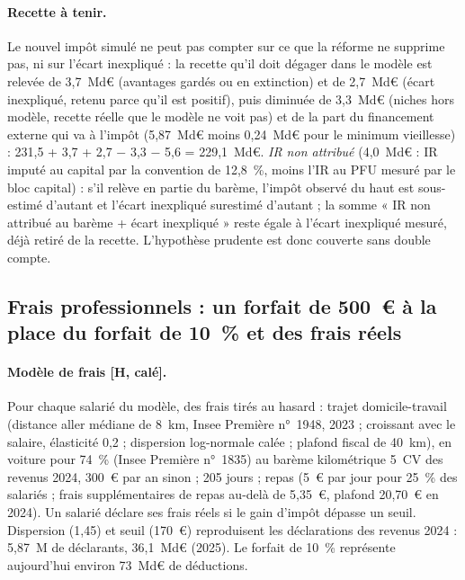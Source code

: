 \paragraph{Recette à tenir.} Le nouvel impôt simulé ne peut pas compter sur ce que la réforme ne supprime pas, ni sur l'écart inexpliqué : la recette qu'il doit dégager dans le modèle est relevée de 3,7~Md€ (avantages gardés ou en extinction) et de 2,7~Md€ (écart inexpliqué, retenu parce qu'il est positif), puis diminuée de 3,3~Md€ (niches hors modèle, recette réelle que le modèle ne voit pas) et de la part du financement externe qui va à l'impôt (5,87~Md€ moins 0,24~Md€ pour le minimum vieillesse) : 231,5 + 3,7 + 2,7 $-$ 3,3 $-$ 5,6 = 229,1~Md€. \emph{IR non attribué} (4,0~Md€ : IR imputé au capital par la convention de 12,8~\%, moins l'IR au PFU mesuré par le bloc capital) : s'il relève en partie du barème, l'impôt observé du haut est sous-estimé d'autant et l'écart inexpliqué surestimé d'autant ; la somme « IR non attribué au barème + écart inexpliqué » reste égale à l'écart inexpliqué mesuré, déjà retiré de la recette. L'hypothèse prudente est donc couverte sans double compte.

\subsection{Frais professionnels : un forfait de 500~€ à la place du forfait de 10~\% et des frais réels}\label{ann:ircsg_frais}

\paragraph{Modèle de frais [H, calé].} Pour chaque salarié du modèle, des frais tirés au hasard : trajet domicile-travail (distance aller médiane de 8~km, Insee Première n°~1948, 2023 ; croissant avec le salaire, élasticité 0,2 ; dispersion log-normale calée ; plafond fiscal de 40~km), en voiture pour 74~\% (Insee Première n°~1835) au barème kilométrique 5~CV des revenus 2024, 300~€ par an sinon ; 205 jours ; repas (5~€ par jour pour 25~\% des salariés ; frais supplémentaires de repas au-delà de 5,35~€, plafond 20,70~€ en 2024). Un salarié déclare ses frais réels si le gain d'impôt dépasse un seuil. Dispersion (1,45) et seuil (170~€) reproduisent les déclarations des revenus 2024 : 5,87~M de déclarants, 36,1~Md€ (2025). Le forfait de 10~\% représente aujourd'hui environ 73~Md€ de déductions.

